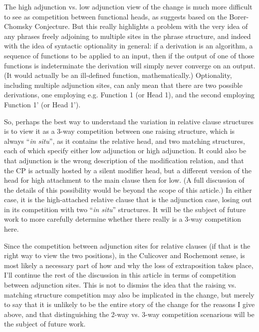 The high adjunction vs. low adjunction view of the change is much more difficult to see as competition between functional heads, as \citet{kroch1994} suggests based on the Borer-Chomsky Conjecture. But this really highlights a problem with the very idea of any phrases freely adjoining to multiple sites in the phrase structure, and indeed with the idea of syntactic optionality in general: if a derivation is an algorithm, a sequence of functions to be applied to an input, then if the output of one of those functions is indeterminate the derivation will simply never converge on an output. (It would actually be an ill-defined function, mathematically.) Optionality, including multiple adjunction sites, can anly mean that there are two possible derivations, one employing e.g. Function 1 (or Head 1), and the second employing Function 1' (or Head 1').

So, perhaps the best way to understand the variation in relative clause structures is to view it as a 3-way competition between one raising structure, which is always ``\textsl{in situ}'', as it contains the relative head, and two matching structures, each of which specify either low adjunction or high adjunction. It could also be that adjunction is the wrong description of the modification relation, and that the CP is actually hosted by a silent modifier head, but a different version of the head for high attachment to the main clause then for low. (A full discussion of the details of this possibility would be beyond the scope of this article.) In either case, it is the high-attached relative clause that is the adjunction case, losing out in its competition with two ``\textsl{in situ}'' structures. It will be the subject of future work to more carefully determine whether there really is a 3-way competition here.


Since the competition between adjunction sites for relative clauses (if that is the right way to view the two positions), in the Culicover and Rochemont sense, is most likely a necessary part of how and why the loss of extraposition takes place, I'll continue the rest of the discussion in this article in terms of competition between adjunction sites. This is not to dismiss the idea that the raising vs. matching structure competition may also be implicated in the change, but merely to say that it is unlikely to be the entire story of the change for the reasons I give above, and that distinguishing the 2-way vs. 3-way competition scenarious will be the subject of future work.

